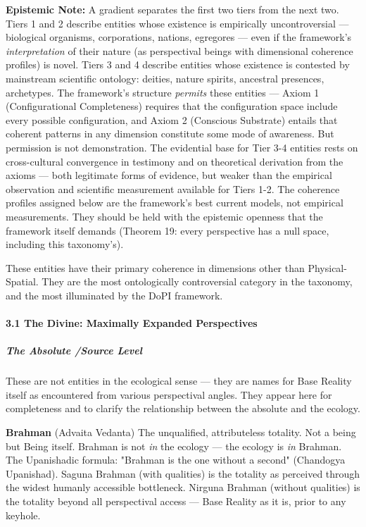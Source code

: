 \textbf{Epistemic Note:} A gradient separates the first two tiers from the next two. Tiers 1 and 2 describe entities whose existence is empirically uncontroversial — biological organisms, corporations, nations, egregores — even if the framework's \textit{interpretation} of their nature (as perspectival beings with dimensional coherence profiles) is novel. Tiers 3 and 4 describe entities whose existence is contested by mainstream scientific ontology: deities, nature spirits, ancestral presences, archetypes. The framework's structure \textit{permits} these entities — Axiom 1 (Configurational Completeness) requires that the configuration space include every possible configuration, and Axiom 2 (Conscious Substrate) entails that coherent patterns in any dimension constitute some mode of awareness. But permission is not demonstration. The evidential base for Tier 3-4 entities rests on cross-cultural convergence in testimony and on theoretical derivation from the axioms — both legitimate forms of evidence, but weaker than the empirical observation and scientific measurement available for Tiers 1-2. The coherence profiles assigned below are the framework's best current models, not empirical measurements. They should be held with the epistemic openness that the framework itself demands (Theorem 19: every perspective has a null space, including this taxonomy's).


These entities have their primary coherence in dimensions other than Physical-Spatial. They are the most ontologically controversial category in the taxonomy, and the most illuminated by the DoPI framework.


\paragraph*{3.1 The Divine: Maximally Expanded Perspectives}


\subparagraph*{The Absolute /\allowbreak  Source Level}


These are not entities in the ecological sense — they are names for Base Reality itself as encountered from various perspectival angles. They appear here for completeness and to clarify the relationship between the absolute and the ecology.


\textbf{Brahman} (Advaita Vedanta) The unqualified, attributeless totality. Not a being but Being itself. Brahman is not \textit{in} the ecology — the ecology is \textit{in} Brahman. The Upanishadic formula: "Brahman is the one without a second" (Chandogya Upanishad). Saguna Brahman (with qualities) is the totality as perceived through the widest humanly accessible bottleneck. Nirguna Brahman (without qualities) is the totality beyond all perspectival access — Base Reality as it is, prior to any keyhole.


